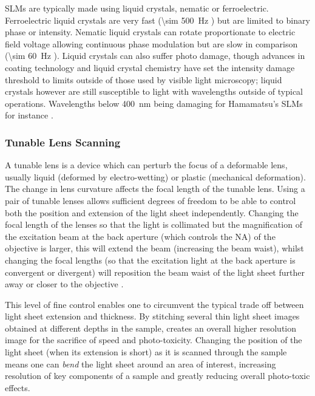 SLMs are typically made using liquid crystals, nematic or ferroelectric. Ferroelectric liquid crystals are very fast (\SI{\sim 500}{\hertz} \cite{Meadowlark2015}) but are limited to binary phase or intensity. Nematic liquid crystals can rotate proportionate to electric field voltage allowing continuous phase modulation but are slow in comparison (\SI{\sim 60}{\hertz} \cite{Hamamatsu2015}). Liquid crystals can also suffer photo damage, though advances in coating technology and liquid crystal chemistry have set the intensity damage threshold to limits outside of those used by visible light microscopy; liquid crystals however are still susceptible to light with wavelengths outside of typical operations. Wavelengths below \SI{400}{\nano\meter} being damaging for Hamamatsu's SLMs for instance \cite{Hamamatsu2015}.

\subsubsection{Tunable Lens Scanning}\label{sec:tunable}

A tunable lens is a device which can perturb the focus of a deformable lens, usually liquid (deformed by electro-wetting) or plastic (mechanical deformation). The change in lens curvature affects the focal length of the tunable lens.  Using a pair of tunable lenses allows sufficient degrees of freedom to be able to control both the position and extension of the light sheet independently. Changing the focal length of the lenses so that the light is collimated but the magnification of the excitation beam at the back aperture (which controls the NA) of the objective is larger, this will extend the beam (increasing the beam waist), whilst changing the focal lengths (so that the excitation light at the back aperture is convergent or divergent) will reposition the beam waist of the light sheet further away or closer to the objective \cite{Chmielewski2015}.

This level of fine control enables one to circumvent the typical trade off between light sheet extension and thickness. By stitching several thin light sheet images obtained at different depths in the sample, creates an overall higher resolution image for the sacrifice of speed and photo-toxicity. Changing the position of the light sheet (when its extension is short) as it is scanned through the sample means one can \textit{bend} the light sheet around an area of interest, increasing resolution of key components of a sample and greatly reducing overall photo-toxic effects.

